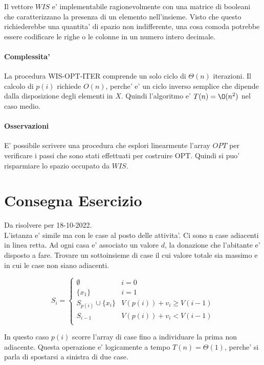 Il vettore $WIS$ e' implementabile ragionevolmente con una matrice di booleani che caratterizzano la presenza di un elemento nell'insieme. Visto che questo richiederebbe una quantita' di spazio non indifferente, una cosa comoda potrebbe essere codificare le righe o le colonne in un numero intero decimale.

\paragraph{Complessita'}

La procedura WIS-OPT-ITER comprende un solo ciclo di $\Theta(n)$ iterazioni.
Il calcolo di $p(i)$ richiede $O(n)$, perche' e' un ciclo inverso semplice che dipende dalla disposizione degli elementi in $X$.
Quindi l'algoritmo e' $T(n) = \O(n^2)$ nel caso medio.

\paragraph{Osservazioni}

E' possibile scrivere una procedura che esplori linearmente l'array $OPT$ per verificare i passi che sono stati effettuati per costruire OPT. Quindi si puo' risparmiare lo spazio occupato da $WIS$.

\section{Consegna Esercizio}
Da risolvere per 18-10-2022. \\

L'istanza e' simile ma con le case al posto delle attivita'.
Ci sono n case adiacenti in linea retta.
Ad ogni casa e' associato un valore $d$, la donazione che l'abitante e' disposto a fare.
Trovare un sottoinsieme di case il cui valore totale sia massimo e in cui le case non siano adiacenti.

\[
    S_i =
    \begin{cases}
        \text{$\emptyset$} & \text{$i = 0$} \\
        \text{$\{x_1\}$} & \text{$i = 1$} \\
        \text{$S_{p(i)} \cup \{x_i\}$} & \text{$V(p(i)) + v_i \geq V(i-1)$} \\
        \text{$S_{i-1}$} & \text{$V(p(i)) + v_i < V(i-1)$} \\
    \end{cases}
\]

In questo caso $p(i)$ scorre l'array di case fino a individuare la prima non adiacente.
Questa operazione e' logicamente a tempo $T(n) = \Theta(1)$, perche' si parla di spostarsi a sinistra di due case.

